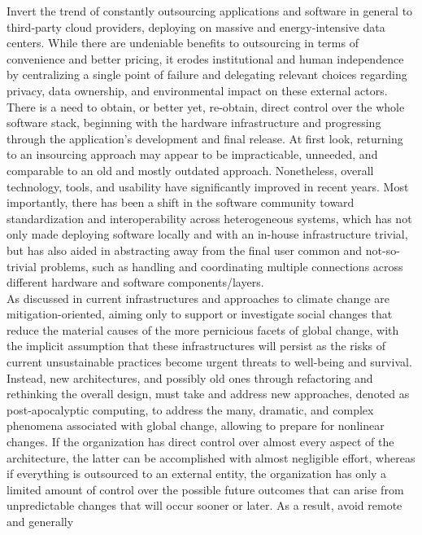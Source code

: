 Invert the trend of constantly outsourcing applications and software in general
to third-party cloud providers, deploying on massive and energy-intensive data centers.
While there are undeniable benefits to outsourcing in terms of convenience and
better pricing, it erodes institutional and human independence by centralizing a
single point of failure and delegating relevant choices regarding privacy, data
ownership, and environmental impact on these external actors\cite{conceptualising_resource_aware}.
\\ %
There is a need to obtain, or better yet, re-obtain, direct control over the whole
software stack, beginning with the hardware infrastructure and progressing
through the application's development and final release. At first look,
returning to an insourcing approach may appear to be impracticable, unneeded,
and comparable to an old and mostly outdated approach. Nonetheless, overall
technology, tools, and usability have significantly improved in recent years. Most
importantly, there has been a shift in the software community toward
standardization and interoperability across heterogeneous systems, which has not
only made deploying software locally and with an in-house infrastructure trivial,
but has also aided in abstracting away from the final user common and not-so-trivial
problems, such as handling and coordinating multiple connections across different
hardware and software components/layers. \\ %
As discussed in \cite{precarious_infrastructure} current infrastructures and approaches
to climate change are mitigation-oriented, aiming only to support or investigate
social changes that reduce the material causes of the more pernicious facets of
global change, with the implicit assumption that these infrastructures will persist
as the risks of current unsustainable practices become urgent threats to well-being
and survival. Instead, new architectures, and possibly old ones through
refactoring and rethinking the overall design, must take and address new approaches,
denoted as post-apocalyptic computing, to address the many, dramatic, and complex
phenomena associated with global change, allowing to prepare for nonlinear
changes. If the organization has direct control over almost every aspect of the architecture,
the latter can be accomplished with almost negligible effort, whereas if everything
is outsourced to an external entity, the organization has only a limited amount
of control over the possible future outcomes that can arise from unpredictable
changes that will occur sooner or later. As a result, avoid remote and generally
